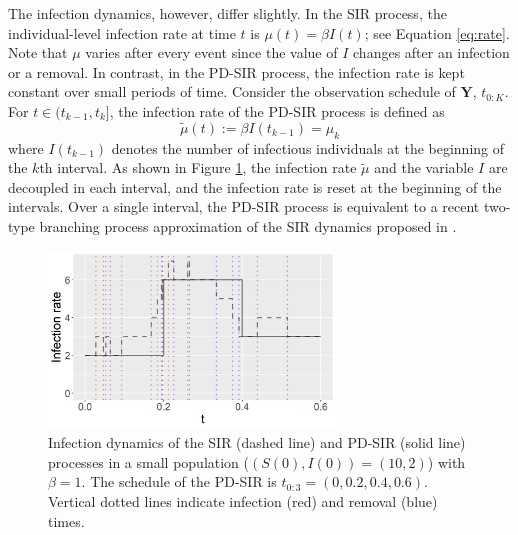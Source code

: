 \documentclass[12pt]{article}
\begin{document}
The infection dynamics, however, differ slightly.
In the SIR process, the individual-level infection rate at time $t$ is $\mu(t) = \beta I(t)$; see Equation \eqref{eq:rate}.
Note that $\mu$ varies after every event since the value of $I$ changes after an infection or a removal.
In contrast, in the PD-SIR process, the infection rate is kept constant over small periods of time. Consider the observation schedule of $\mathbf{Y}$, $t_{0:K}$. For $t \in (t_{k-1}, t_k]$, the infection rate of the PD-SIR process is defined as
$$\tilde{\mu}(t) := \beta I(t_{k - 1}) = \mu_k$$
where $I(t_{k-1})$ denotes the number of infectious individuals at the beginning of the $k$th interval. As shown in Figure \ref{fig:mu}, the infection rate $\tilde{\mu}$ and the variable $I$ are decoupled in each interval, and the infection rate is reset at the beginning %
of the intervals. Over a single interval, the PD-SIR process is equivalent to a recent two-type branching process approximation of the SIR dynamics proposed in \cite{Ho.2018b}. 

\begin{figure}
	\begin{center}
		\includegraphics[width=3in]{infection_rate_SIR_PDSIR}
	\end{center}
	\caption{Infection dynamics of the SIR (dashed line) and PD-SIR (solid line) processes in a small population ($(S(0), I(0)) = (10,2)$) with $\beta=1$. The schedule of the PD-SIR is $t_{0:3}=(0, 0.2, 0.4, 0.6)$.
		Vertical dotted lines indicate infection (red) and removal (blue) times. \label{fig:mu}}
\end{figure}
\end{document}
